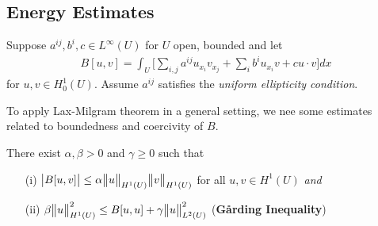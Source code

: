 \documentclass[12pt,a4paper]{report}
\begin{document}
\subsection*{Energy Estimates}

Suppose $a^{ij}, b^i, c \in L^{\infty}(U)$ for $U$ open, bounded and let
\begin{align*}
B[u,v] = \int_U \Big[ \sum_{i,j} a^{ij}u_{x_i}v_{x_j} + \sum_i b^i u_{x_i} v + cu\cdot v \Big] dx
\end{align*}
for $u,v\in H_0^1 (U)$. Assume $a^{ij}$ satisfies the \emph{uniform ellipticity condition}.
\s

To apply Lax-Milgram theorem in a general setting, we nee some estimates related to boundedness and coercivity of $B$. 
\s

\thm There exist $\alpha, \beta >0$ and $\gamma \geq 0$ such that
\begin{itemize}
\item[(i)] $\big| B[u,v]\big| \leq \alpha \bigl\lVert u\bigr\rVert_{H^1(U)} \bigl\lVert v\bigr\rVert_{H^1(U)}$ for all $u,v\in H^1(U)$ \quad \emph{and}
\item[(ii)] $\beta \bigl\lVert u\bigr\rVert_{H^1(U)}^2 \leq B[u,u] + \gamma \bigl\lVert u\bigr\rVert_{L^2(U)}^2$ (\textbf{G{\aa}rding Inequality})
\end{itemize}
\end{document}
